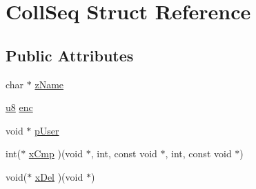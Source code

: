 \hypertarget{struct_coll_seq}{\section{Coll\-Seq Struct Reference}
\label{struct_coll_seq}
}
\subsection*{Public Attributes}
\begin{DoxyCompactItemize}
\item 
char $\ast$ \hyperlink{struct_coll_seq_a48d6d5f71d4f8a3ab122903464e8b4a1}{z\-Name}
\item 
\hyperlink{sqlite3_8c_a74a0f6424ae628af25f23f0a35f6ead3}{u8} \hyperlink{struct_coll_seq_add27da1a70ed6f538447e9183eeb4838}{enc}
\item 
void $\ast$ \hyperlink{struct_coll_seq_a3cee924d41e730ccec7f686eb5b6f041}{p\-User}
\item 
int($\ast$ \hyperlink{struct_coll_seq_a47fc6d3a01eee354332ca515a8b493ce}{x\-Cmp} )(void $\ast$, int, const void $\ast$, int, const void $\ast$)
\item 
void($\ast$ \hyperlink{struct_coll_seq_a1c0dd3ad98c7bb2ef517f9170134a125}{x\-Del} )(void $\ast$)
\end{DoxyCompactItemize}


